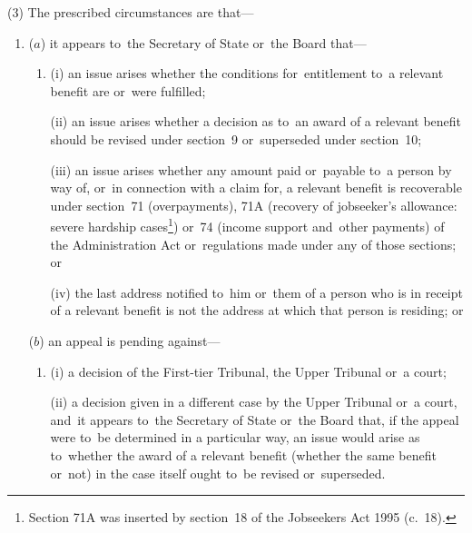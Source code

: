 \documentclass[12pt,a4paper]{article}
\begin{document}
(3) The prescribed circumstances are that—
\begin{enumerate}\item[]
($a$) it appears to~the Secretary of State 
or~the Board  %
that—
\begin{enumerate}\item[]
(i) an issue arises whether the conditions for~entitlement to~a relevant benefit are or~were fulfilled;

(ii) an issue arises whether a decision as to~an award of a relevant benefit should be revised under section~9 or~superseded under section~10;

(iii) an issue arises whether any amount paid or~payable to~a person by way of, or~in connection with a claim for, a relevant benefit is recoverable under section~71 (overpayments), 71A (recovery of jobseeker’s allowance: severe hardship cases\footnote{\frenchspacing Section 71A was inserted by section~18 of the Jobseekers Act 1995 (c.~18).}) or~74 (income support and~other payments) of the Administration Act or~regulations made under any of those sections; or

(iv) the last address notified to~him 
or~them %
of a person who is in receipt of a relevant benefit is not the address at which that person is residing; or
\end{enumerate}

($b$) an appeal is pending against—
\begin{enumerate}\item[]
(i) a decision of 
the First-tier Tribunal, the Upper Tribunal  %
or~a court;

(ii) a decision given in a different case by 
the Upper Tribunal  %
or~a court, and~it appears to~the Secretary of State 
or~the Board  %
that, if the appeal were to~be determined in a particular way, an issue would arise as to~whether the award of a relevant benefit (whether the same benefit or~not) in the case itself ought to~be revised or~superseded.
\end{enumerate}
\end{enumerate}
\end{document}
